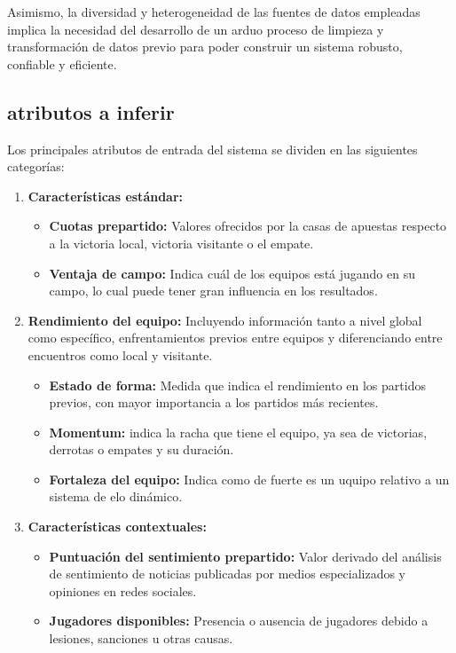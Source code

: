 Asimismo, la diversidad y heterogeneidad de las fuentes de datos empleadas implica la necesidad del desarrollo de un arduo proceso de limpieza y transformación de datos previo para poder construir un sistema robusto, confiable y eficiente. 

\subsection{atributos a inferir}

Los principales atributos de entrada del sistema se dividen en las siguientes categorías:

\begin{enumerate}
    \item \textbf{Características estándar:}
        \begin{itemize}
            \item \textbf{Cuotas prepartido:} Valores ofrecidos por la casas de apuestas respecto a la victoria local, victoria visitante o el empate.
            \item \textbf{Ventaja de campo:} Indica cuál de los equipos está jugando en su campo, lo cual puede tener gran influencia en los resultados.
        \end{itemize}
    \item \textbf{Rendimiento del equipo:} Incluyendo información tanto a nivel global como específico, enfrentamientos previos entre equipos y diferenciando entre encuentros como local y visitante.
    \begin{itemize}
        \item \textbf{Estado de forma:} Medida que indica el rendimiento en los partidos previos, con mayor importancia a los partidos más recientes.
        \item \textbf{Momentum:} indica la racha que tiene el equipo, ya sea de victorias, derrotas o empates y su duración.
        \item \textbf{Fortaleza del equipo:} Indica como de fuerte es un uquipo relativo a un sistema de elo dinámico.
    \end{itemize}
    \item \textbf{Características contextuales:}
    \begin{itemize}
        \item \textbf{Puntuación del sentimiento prepartido:} Valor derivado del análisis de sentimiento de noticias publicadas por medios especializados y opiniones en redes sociales.
        \item \textbf{Jugadores disponibles:} Presencia o ausencia de jugadores debido a lesiones, sanciones u otras causas.

\end{itemize}
\end{enumerate}
